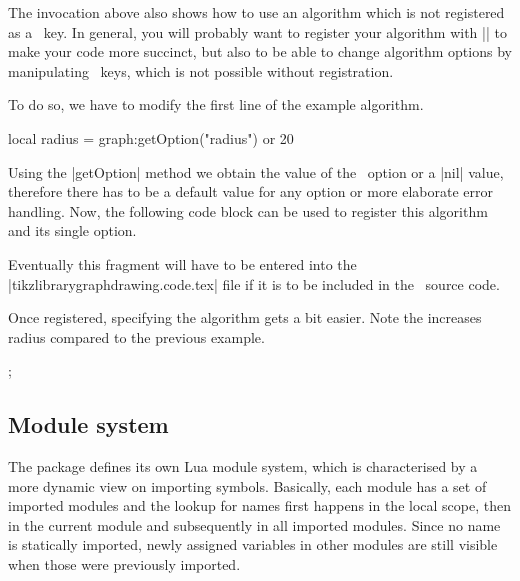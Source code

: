 The invocation above also shows how to use an algorithm which is not
registered as a \tikzname\ key.  In general, you will probably want to
register your algorithm with |\tikzgraphsset| to make your code more
succinct, but also to be able to change algorithm options by manipulating
\tikzname\ keys, which is not possible without registration.

To do so, we have to modify the first line of the example algorithm.

\begin{codeexample}
   local radius = graph:getOption("radius") or 20
\end{codeexample}

Using the |getOption| method we obtain the value of the
\tikzname\ option or a |nil| value, therefore there has to be a
default value for any option or more elaborate error handling.  Now,
the following code block can be used to register this algorithm and
its single option.

\begin{codeexample}
\end{codeexample}


Eventually this fragment will have to be entered into the
|tikzlibrarygraphdrawing.code.tex| file if it is to be included in the
\pgfname\ source code.

Once registered, specifying the algorithm gets a bit easier. Note the
increases radius compared to the previous example.

\begin{codeexample}[]
\tikzpicture [graph drawing={simpleexample, radius = 30}]
  ;
\endtikzpicture
\end{codeexample}

\subsection{Module system}
The package defines its own Lua module system, which is characterised by a
more dynamic view on importing symbols.  Basically, each module has a
set of imported modules and the lookup for names first happens in the local
scope, then in the current module and subsequently in all imported
modules.  Since no name is statically imported, newly assigned
variables in other modules are still visible when those were
previously imported.

